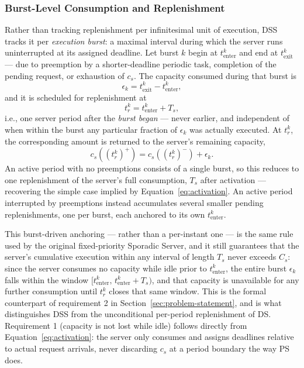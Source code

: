 \documentclass[conference]{IEEEtran}
\begin{document}
    \subsubsection{Burst-Level Consumption and Replenishment}
    Rather than tracking replenishment per infinitesimal unit of execution, DSS tracks it per \emph{execution burst}: a maximal interval during which the server runs uninterrupted at its assigned deadline. Let burst $k$ begin at $t_{\mathrm{enter}}^{k}$ and end at $t_{\mathrm{exit}}^{k}$ — due to preemption by a shorter-deadline periodic task, completion of the pending request, or exhaustion of $c_s$. The capacity consumed during that burst is
    \begin{equation}
        \epsilon_k = t_{\mathrm{exit}}^{k} - t_{\mathrm{enter}}^{k},
    \end{equation}
    and it is scheduled for replenishment at
    \begin{equation}
        t_r^{k} = t_{\mathrm{enter}}^{k} + T_s,
        \label{eq:burst-replenish-time}
    \end{equation}
    i.e., one server period after the \emph{burst began} — never earlier, and independent of when within the burst any particular fraction of $\epsilon_k$ was actually executed. At $t_r^k$, the corresponding amount is returned to the server's remaining capacity,
    \begin{equation}
        c_s\!\left((t_r^{k})^+\right) = c_s\!\left((t_r^{k})^-\right) + \epsilon_k.
        \label{eq:burst-replenish-amount}
    \end{equation}
    An active period with no preemptions consists of a single burst, so this reduces to one replenishment of the server's full consumption, $T_s$ after activation — recovering the simple case implied by Equation~\ref{eq:activation}. An active period interrupted by preemptions instead accumulates several smaller pending replenishments, one per burst, each anchored to its own $t_{\mathrm{enter}}^k$.

    This burst-driven anchoring — rather than a per-instant one — is the same rule used by the original fixed-priority Sporadic Server, and it still guarantees that the server's cumulative execution within any interval of length $T_s$ never exceeds $C_s$: since the server consumes no capacity while idle prior to $t_{\mathrm{enter}}^k$, the entire burst $\epsilon_k$ falls within the window $[t_{\mathrm{enter}}^k,\, t_{\mathrm{enter}}^k + T_s)$, and that capacity is unavailable for any further consumption until $t_r^k$ closes that same window. This is the formal counterpart of requirement 2 in Section~\ref{sec:problem-statement}, and is what distinguishes DSS from the unconditional per-period replenishment of DS. Requirement 1 (capacity is not lost while idle) follows directly from Equation~\ref{eq:activation}: the server only consumes and assigns deadlines relative to actual request arrivals, never discarding $c_s$ at a period boundary the way PS does.
\end{document}
